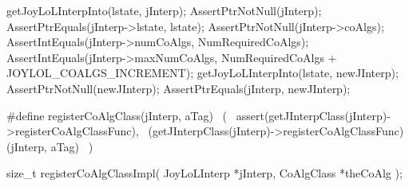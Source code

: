 
\startCTest
  getJoyLoLInterpInto(lstate, jInterp);
  AssertPtrNotNull(jInterp);
  AssertPtrEquals(jInterp->lstate, lstate);
  AssertPtrNotNull(jInterp->coAlgs);
  AssertIntEquals(jInterp->numCoAlgs, NumRequiredCoAlgs);
  AssertIntEquals(jInterp->maxNumCoAlgs,
    NumRequiredCoAlgs + JOYLOL_COALGS_INCREMENT);
  getJoyLoLInterpInto(lstate, newJInterp);
  AssertPtrNotNull(newJInterp);
  AssertPtrEquals(jInterp, newJInterp);
\stopCTest
\stopTestCase
\stopTestSuite

\startTestSuite[registerCoAlgebra]

\startCHeader
#define registerCoAlgClass(jInterp, aTag)                              \
  (                                                                    \
    assert(getJInterpClass(jInterp)->registerCoAlgClassFunc),          \
    (getJInterpClass(jInterp)->registerCoAlgClassFunc)(jInterp, aTag)  \
  )
\stopCHeader

\setCHeaderStream{private}
\startCHeader
size_t registerCoAlgClassImpl(
  JoyLoLInterp *jInterp,
  CoAlgClass *theCoAlg
);
\stopCHeader
\setCHeaderStream{public}

